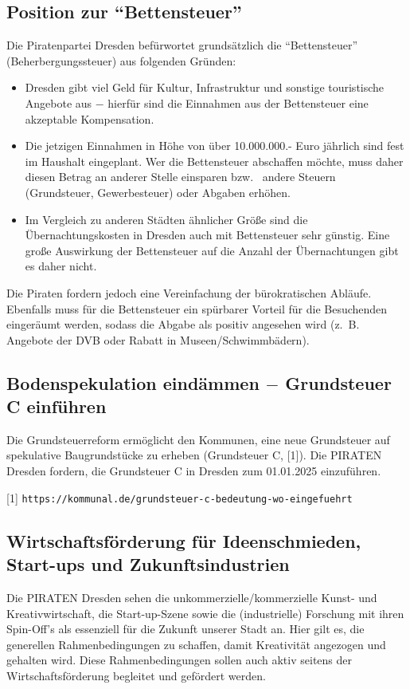 \documentclass[a4paper, 11pt]{article}
\begin{document}
\subsection{Position zur ``Bettensteuer''}
Die Piratenpartei Dresden befürwortet grundsätzlich die ``Bettensteuer'' (Beherbergungssteuer) aus folgenden Gründen:

\begin{itemize}

    \item Dresden gibt viel Geld für Kultur, Infrastruktur und sonstige touristische Angebote aus $-$ hierfür sind die Einnahmen aus der Bettensteuer eine akzeptable Kompensation.

    \item Die jetzigen Einnahmen in Höhe von über 10.000.000.- Euro jährlich sind fest im Haushalt eingeplant. Wer die Bettensteuer abschaffen möchte, muss daher diesen Betrag an anderer Stelle einsparen bzw.~ andere Steuern (Grundsteuer, Gewerbesteuer) oder Abgaben erhöhen.

    \item Im Vergleich zu anderen Städten ähnlicher Größe sind die Übernachtungskosten in Dresden auch mit Bettensteuer sehr günstig. Eine große Auswirkung der Bettensteuer auf die Anzahl der Übernachtungen gibt es daher nicht.
\end{itemize}

Die Piraten fordern jedoch eine Vereinfachung der bürokratischen Abläufe. Ebenfalls muss für die Bettensteuer ein spürbarer Vorteil für die Besuchenden eingeräumt werden, sodass die Abgabe als positiv angesehen wird (z. B. Angebote der DVB oder Rabatt in Museen/Schwimmbädern).


\subsection{Bodenspekulation eindämmen $-$ Grundsteuer C einführen}
Die Grundsteuerreform ermöglicht den Kommunen, eine neue Grundsteuer auf spekulative Baugrundstücke zu erheben (Grundsteuer C, [1]). Die PIRATEN Dresden fordern, die Grundsteuer C in Dresden zum 01.01.2025 einzuführen.\newline

\footnotesize{[1] \tt{https://kommunal.de/grundsteuer-c-bedeutung-wo-eingefuehrt}}


\subsection{Wirtschaftsförderung für Ideenschmieden, Start-ups und Zukunftsindustrien}
Die PIRATEN Dresden sehen die unkommerzielle/kommerzielle Kunst- und Kreativwirtschaft, die Start-up-Szene sowie die (industrielle) Forschung mit ihren Spin-Off's als essenziell für die Zukunft unserer Stadt an. Hier gilt es, die generellen Rahmenbedingungen zu schaffen, damit Kreativität angezogen und gehalten wird. Diese Rahmenbedingungen sollen auch aktiv seitens der Wirtschaftsförderung begleitet und gefördert werden.
\end{document}
